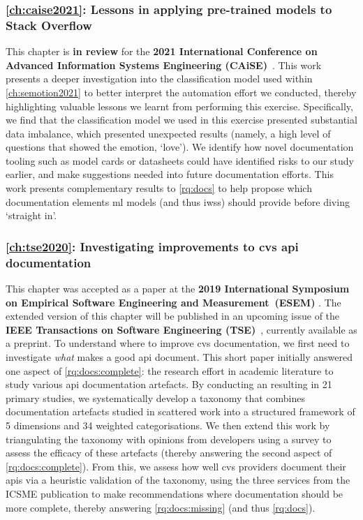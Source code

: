 \subsubsection[Chapter 7: Lessons in applying pre-trained models to Stack Overflow]{\cref{ch:caise2021}: Lessons in applying pre-trained models to Stack Overflow} This chapter is \textbf{in review} for the \textbf{2021 International Conference on Advanced Information Systems Engineering (CAiSE)}~\citep{Graetsch:2021caise}. This work presents a deeper investigation into the classification model used within \cref{ch:semotion2021} to better interpret the automation effort we conducted, thereby highlighting valuable lessons we learnt from performing this exercise. Specifically, we find that the classification model we used in this exercise presented substantial data imbalance, which presented unexpected results (namely, a high level of   questions that showed the emotion, `love'). We identify how novel documentation tooling such as model cards \citep{Mitchell:2018in} or datasheets \citep{Gebru:2018wh} could have identified risks to our study earlier, and make suggestions needed into future documentation efforts. This work presents complementary  results to \ref{rq:docs} to help propose which documentation elements \gls{ml} models (and thus \glspl{iws}) should provide before diving `straight in'.

\subsubsection[Chapter 7: Investigating improvements to CVS API documentation]{\cref{ch:tse2020}: Investigating improvements to \gls{cvs} \gls{api} documentation} This chapter was accepted as a paper at the \textbf{2019 International Symposium on Empirical Software Engineering and Measurement~(ESEM)} \citep{Cummaudo:2020icse}. The extended version of this chapter will be published in an upcoming issue of the \textbf{IEEE Transactions on Software Engineering (TSE)}~\citep{Cummaudo:2020tse}, currently available as a preprint. To understand where to improve \gls{cvs} documentation, we first need to investigate \textit{what} makes a good \gls{api} document. This short paper initially answered one aspect of \ref{rq:docs:complete}: the research effort in academic literature to study various \gls{api} documentation artefacts. By conducting an  resulting in 21 primary studies, we systematically develop a taxonomy that combines documentation artefacts studied in scattered work into a structured framework of 5 dimensions and 34 weighted categorisations. We then extend this work by triangulating the taxonomy with opinions from developers using a survey to assess the efficacy of these artefacts (thereby answering the second aspect of \ref{rq:docs:complete}). From this, we assess how well \gls{cvs} providers document their \glspl{api} via a heuristic validation of the taxonomy, using the three services from the ICSME publication to make recommendations where documentation should be more complete, thereby answering \ref{rq:docs:missing} (and thus \ref{rq:docs}).

